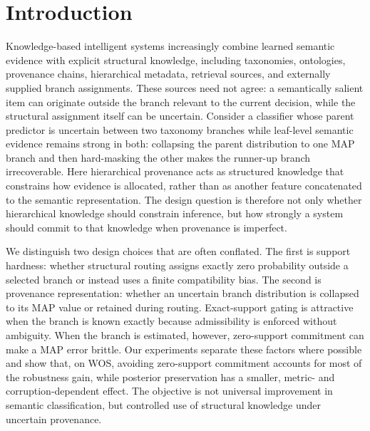 \documentclass[preprint,11pt]{elsarticle}
\begin{document}
\section{Introduction}
Knowledge-based intelligent systems increasingly combine learned semantic evidence with explicit structural knowledge, including taxonomies, ontologies, provenance chains, hierarchical metadata, retrieval sources, and externally supplied branch assignments. These sources need not agree: a semantically salient item can originate outside the branch relevant to the current decision, while the structural assignment itself can be uncertain. Consider a classifier whose parent predictor is uncertain between two taxonomy branches while leaf-level semantic evidence remains strong in both: collapsing the parent distribution to one MAP branch and then hard-masking the other makes the runner-up branch irrecoverable. Here hierarchical provenance acts as structured knowledge that constrains how evidence is allocated, rather than as another feature concatenated to the semantic representation. The design question is therefore not only whether hierarchical knowledge should constrain inference, but how strongly a system should commit to that knowledge when provenance is imperfect.

We distinguish two design choices that are often conflated. The first is support hardness: whether structural routing assigns exactly zero probability outside a selected branch or instead uses a finite compatibility bias. The second is provenance representation: whether an uncertain branch distribution is collapsed to its MAP value or retained during routing. Exact-support gating is attractive when the branch is known exactly because admissibility is enforced without ambiguity. When the branch is estimated, however, zero-support commitment can make a MAP error brittle. Our experiments separate these factors where possible and show that, on WOS, avoiding zero-support commitment accounts for most of the robustness gain, while posterior preservation has a smaller, metric- and corruption-dependent effect. The objective is not universal improvement in semantic classification, but controlled use of structural knowledge under uncertain provenance.
\end{document}
